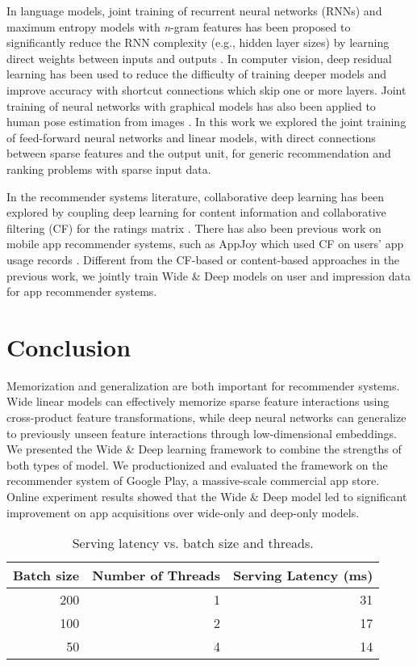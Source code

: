 \documentclass{sig-alternate-05-2015}
\begin{document}
In language models, joint training of recurrent neural networks (RNNs) and maximum entropy models with \textit{n}-gram features has been proposed to significantly reduce the RNN complexity (e.g., hidden layer sizes) by learning direct weights between inputs and outputs \cite{MaxentRNN11}.
In computer vision, deep residual learning \cite{DeepResidualLearning} has been used to reduce the difficulty of training deeper models and improve accuracy with shortcut connections which skip one or more layers.
Joint training of neural networks with graphical models has also been applied to human pose estimation from images \cite{JointCNNMRF14}. In this work we explored the joint training of feed-forward neural networks and linear models, with direct connections between sparse features and the output unit, for generic recommendation and ranking problems with sparse input data.

In the recommender systems literature, collaborative deep learning has been explored by coupling deep learning for content information and collaborative filtering (CF) for the ratings matrix \cite{CollaborativeDLRecsKDD15}. There has also been previous work on mobile app recommender systems, such as AppJoy which used CF on users' app usage records \cite{AppJoyMobiSys11}. Different from the CF-based or content-based approaches in the previous work, we jointly train Wide \& Deep models on user and impression data for app recommender systems.

\section{Conclusion}
Memorization and generalization are both important for recommender systems. Wide linear models can effectively memorize sparse feature interactions using cross-product feature transformations, while deep neural networks can generalize to previously unseen feature interactions through low-dimensional embeddings. We presented the Wide \& Deep learning framework to combine the strengths of both types of model. We productionized and evaluated the framework on the recommender system of Google Play, a massive-scale commercial app store. Online experiment results showed that the Wide \& Deep model led to significant improvement on app acquisitions over wide-only and deep-only models.

\begin{table}
\caption{Serving latency vs. batch size and threads.}
\label{tab:ServingLatency}
\begin{tabular}{rrr}
\toprule
Batch size & Number of Threads & Serving Latency (ms)\\ \toprule
200 & 1 & 31 \\ \midrule
100 &  2 & 17 \\ \midrule
50 & 4 & 14 \\ \bottomrule
\end{tabular}
\vspace{-13pt}
\end{table}



\end{document}
